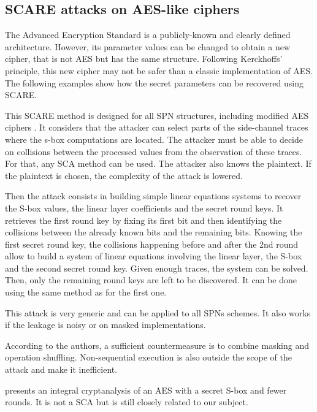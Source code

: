 \documentclass[11pt]{sdm}
\begin{document}

\subsection{SCARE attacks on AES-like ciphers}

The Advanced Encryption Standard is a publicly-known and clearly defined architecture. 
However, its parameter values can be changed to obtain a new cipher, that is not AES but has the same structure.
Following Kerckhoffs' principle, this new cipher may not be safer than a classic implementation of AES.
The following examples show how the secret parameters can be recovered using SCARE.

This SCARE method is designed for all SPN structures, including modified AES ciphers \parencite{Rivain_Roche_2013}.
It considers that the attacker can select parts of the side-channel traces where the s-box computations are located.
The attacker must be able to decide on collisions between the processed values from the observation of these traces.
For that, any SCA method can be used.
The attacker also knows the plaintext. If the plaintext is chosen, the complexity of the attack is lowered.

Then the attack consists in building simple linear equations systems to recover the S-box values, the linear layer coefficients and the secret round keys.
It retrieves the first round key by fixing its first bit and then identifying the collisions between the already known bits and the remaining bits.
Knowing the first secret round key, the collisions happening before and after the 2nd round allow to build a system of linear equations involving the linear layer, the S-box and the second secret round key.
Given enough traces, the system can be solved.
Then, only the remaining round keys are left to be discovered.
It can be done using the same method as for the first one.

This attack is very generic and can be applied to all SPNs schemes.
It also works if the leakage is noisy or on masked implementations.

According to the authors, a sufficient countermeasure is to combine masking and operation shuffling.
Non-sequential execution is also outside the scope of the attack and make it inefficient.

\parencite{Tiessen_Knudsen_Kölbl_Lauridsen_2015} presents an integral cryptanalysis of an AES with a secret S-box and fewer rounds. It is not a SCA but is still closely related to our subject.
\end{document}
